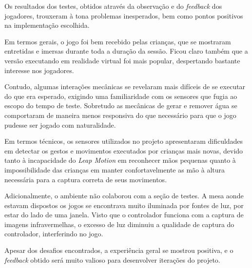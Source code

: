 Os resultados dos testes, obtidos através da observação e do 
\textit{feedback} dos jogadores, trouxeram à tona problemas inesperados, 
bem como pontos positivos na implementação escolhida.

Em termos gerais, o jogo foi bem recebido pelas crianças, que se 
mostraram entretidas e imersas durante toda a duração da sessão. Ficou claro 
também que a versão executando em realidade virtual foi mais popular, 
despertando bastante interesse nos jogadores.

Contudo, algumas interações mecânicas se revelaram mais difíceis de se 
executar do que era esperado, exigindo uma familiaridade com os sensores 
que fugia ao escopo do tempo de teste. Sobretudo as mecânicas de gerar e 
remover água se comportaram de maneira menos responsiva do que necessário 
para que o jogo pudesse ser jogado com naturalidade.

Em termos técnicos, os sensores utilizados no projeto apresentaram 
dificuldades em detectar os gestos e movimentos executados por crianças 
mais novas, devido tanto à incapacidade do \textit{Leap Motion} em 
reconhecer mãos pequenas quanto à impossibilidade das crianças em 
manter confortavelmente as mão à altura necessária para a captura 
correta de seus movimentos. 

Adicionalmente, o ambiente não colaborou com a seção de testes. A mesa 
aonde estavam dispostos os jogos se encontrava muito iluminada por 
fontes de luz, por estar do lado de uma janela. Visto que o controlador 
funciona com a captura de imagens infravermelhas, o excesso de luz 
diminuiu a qualidade de captura do controlador, interferindo no jogo.

Apesar dos desafios encontrados, a experiência geral se mostrou 
positiva, e o \textit{feedback} obtido será muito valioso para desenvolver 
iterações do projeto.

